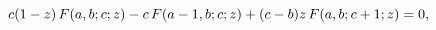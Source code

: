 \[c(1-z)\mathop{F\/}\nolimits\!\left(a,b;c;z\right)-c\mathop{F\/}\nolimits\!%
\left(a-1,b;c;z\right)+(c-b)z\mathop{F\/}\nolimits\!\left(a,b;c+1;z\right)=0,\]